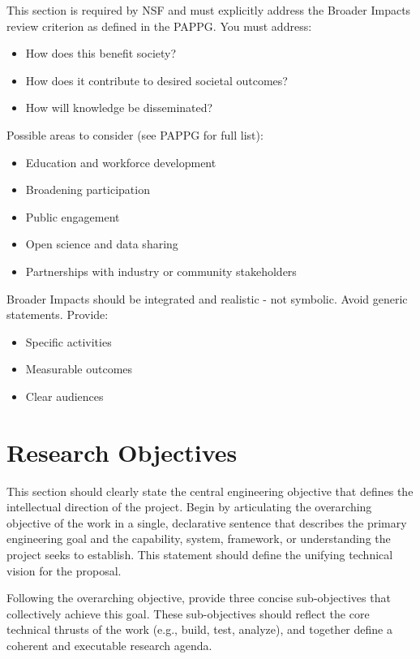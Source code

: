 \documentclass[11pt,letterpaper]{article}
\begin{document}
{This section is required by NSF and must explicitly address the Broader Impacts review criterion as defined in the PAPPG.
You must address:
\begin{itemize}
    \item How does this benefit society?
    \item How does it contribute to desired societal outcomes?
    \item How will knowledge be disseminated?
\end{itemize}
Possible areas to consider (see PAPPG for full list):
\begin{itemize}
    \item Education and workforce development
    \item Broadening participation
    \item Public engagement
    \item Open science and data sharing
    \item Partnerships with industry or community stakeholders
\end{itemize}
Broader Impacts should be integrated and realistic - not symbolic.
Avoid generic statements. Provide:
\begin{itemize}
    \item Specific activities
    \item Measurable outcomes
    \item Clear audiences
\end{itemize}

\section{Research Objectives}

This section should clearly state the central engineering objective that defines the intellectual direction of the project. Begin by articulating the overarching objective of the work in a single, declarative sentence that describes the primary engineering goal and the capability, system, framework, or understanding the project seeks to establish. This statement should define the unifying technical vision for the proposal.

Following the overarching objective, provide three concise sub-objectives that collectively achieve this goal. These sub-objectives should reflect the core technical thrusts of the work (e.g., build, test, analyze), and together define
a coherent and executable research agenda.

}
\end{document}
